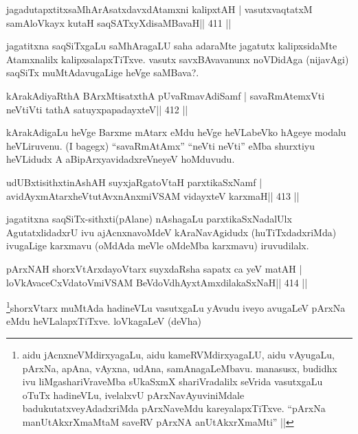 \begin{shl}
jagadutapxtitxsaMhArAsatxdavxdAtamxni kalipxtAH |
vasutxvaqtatxM samAloVkayx kutaH saqSATxyXdisaMBavaH\hfill || 411 ||
\end{shl}

\begin{artha}
jagatitxna saqSiTxgaLu saMhAragaLU saha adaraMte jagatutx kalipxsidaMte  Atamxnalilx kalipxsalapxTiTxve. vasutx savxBAvavanunx noVDidAga (nijavAgi) saqSiTx muMtAdavugaLige heVge saMBava?.
\end{artha}

\begin{shl}
kArakAdiyaRthA BArxMtisatxthA pUvaRmavAdiSamf |
savaRmAtemxVti neVtiVti tathA satuyxpapadayxteV\hfill || 412 ||
\end{shl}

\begin{artha}
kArakAdigaLu heVge Barxme mAtarx eMdu heVge heVLabeVko hAgeye modalu heVLiruvenu. (I bagegx) ``savaRmAtAmx'' ``neVti neVti'' eMba  shurxtiyu heVLidudx A aBipArxyavidadxreVneyeV hoMduvudu.
\end{artha}


\begin{shl}
udUBxtisithxtinAshAH suyxjaRgatoV\s taH parxtikaSxNamf |
avidAyxmAtarxheVtutAvxnAnxmiVSAM vidayxteV karxmaH\hfill || 413 ||
\end{shl}

\begin{artha}
jagatitxna saqSiTx-sithxti(pAlane) nAshagaLu parxtikaSxNadalUlx AgutatxlidadxrU ivu ajAcnxnavoMdeV kAraNavAgidudx (huTiTxdadxriMda) ivugaLige karxmavu (oMdAda meVle oMdeMba karxmavu) iruvudilalx.
\end{artha}


\begin{shl}
pArxNAH shorxVtArxdayoV\s tarx suyxdaRsha sapatx ca yeV matAH |
loVkAvaceCxVdatoV\s miVSAM BeVdoV\s dhAyxtAmxdilakaSxNaH\hfill || 414 ||
\end{shl}

\footnote{aidu jAcnxneVMdirxyagaLu, aidu kameRVMdirxyagaLU, aidu 
vAyugaLu, pArxNa, apAna, vAyxna, udAna, samAnagaLeMbavu. manasusx, 
budidhx ivu liMgashariVraveMba sUkaSxmX shariVradalilx seVrida 
vasutxgaLu oTuTx hadineVLu, ivelalxvU pArxNavAyuviniMdale 
badukutatxveyAdadxriMda pArxNaveMdu kareyalapxTiTxve. ``pArxNa 
manUtAkxrXmaMtaM saveRV pArxNA anUtAkxrXmaMti'' ||}shorxVtarx muMtAda 
hadineVLu vasutxgaLu yAvudu iveyo avugaLeV pArxNa eMdu heVLalapxTiTxve. 
loVkagaLeV (deVha)


